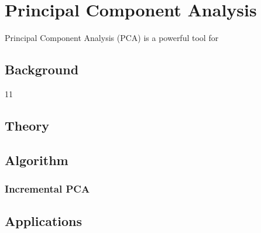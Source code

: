 %
\chapter{Principal Component Analysis}
\label{cpt:pca}

Principal Component Analysis (PCA) is a powerful tool for 

\section{Background}
11
\section{Theory}

\section{Algorithm}

\subsection{Incremental PCA}

\section{Applications}
